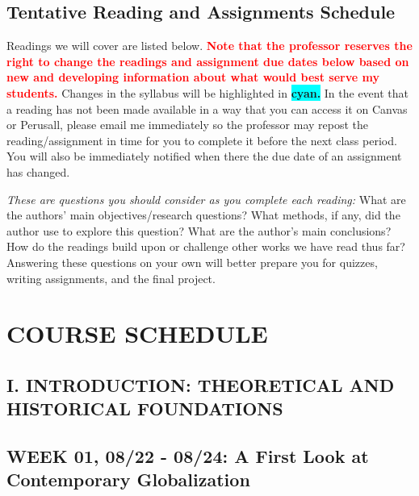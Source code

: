 \documentclass[11pt,]{article}
\begin{document}
\hypertarget{tentative-reading-and-assignments-schedule}{%
\subsection{Tentative Reading and Assignments
Schedule}\label{tentative-reading-and-assignments-schedule}}

Readings we will cover are listed below.
\textcolor{red}{\bf{Note that the professor reserves the right to change the readings and assignment due dates below based on new and developing information about what would best serve my students.}}
Changes in the syllabus will be highlighted in
\colorbox{Cyan}{\bf{cyan.}} In the event that a reading has not been
made available in a way that you can access it on Canvas or Perusall,
please email me immediately so the professor may repost the
reading/assignment in time for you to complete it before the next class
period. You will also be immediately notified when there the due date of
an assignment has changed.

\emph{These are questions you should consider as you complete each
reading:} What are the authors' main objectives/research questions? What
methods, if any, did the author use to explore this question? What are
the author's main conclusions? How do the readings build upon or
challenge other works we have read thus far? Answering these questions
on your own will better prepare you for quizzes, writing assignments,
and the final project.

\hypertarget{course-schedule}{%
\section{COURSE SCHEDULE}\label{course-schedule}}

\vspace{\baselineskip}

\hypertarget{i.-introduction-theoretical-and-historical-foundations}{%
\subsection{I. INTRODUCTION: THEORETICAL AND HISTORICAL
FOUNDATIONS}\label{i.-introduction-theoretical-and-historical-foundations}}

\bigbreak

\hypertarget{week-01-0822---0824-a-first-look-at-contemporary-globalization}{%
\subsection{WEEK 01, 08/22 - 08/24: A First Look at Contemporary
Globalization}\label{week-01-0822---0824-a-first-look-at-contemporary-globalization}}
\end{document}
